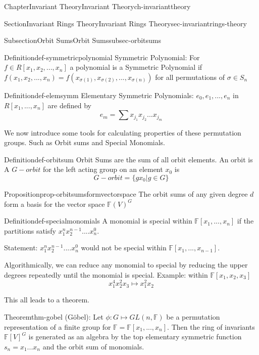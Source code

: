 \documentclass[oneside,10pt,]{book}
\begin{document}
\begin{chapterptx}{Chapter}{Invariant Theory}{}{Invariant Theory}{}{}{ch-invarianttheory}
\begin{sectionptx}{Section}{Invariant Rings Theory}{}{Invariant Rings Theory}{}{}{sec-invariantrings-theory}
\begin{subsectionptx}{Subsection}{Orbit Sums}{}{Orbit Sums}{}{}{subsec-orbitsums}
\begin{definition}{Definition}{}{def-symmetricpolynomial}%
Symmetric Polynomial: For \(f \in R[x_1,x_2,...,x_n]\) a polynomial is a Symmetric Polynomial if \(f(x_1,x_2,...,x_n) = f(x_{\sigma(1)},x_{\sigma(2)},...,x_{\sigma(n)})\) for all permutations of \(\sigma \in S_n\)%
\end{definition}
\begin{definition}{Definition}{}{def-elemsymm}%
Elementary Symmetric Polynomials: \(e_0,e_1,...,e_n\) in \(R[x_1,...,x_n]\) are defined by%
\begin{equation*}
e_{m}=\sum x_{j_1}x_{j_2}...x_{j_m} 
\end{equation*}
%
\end{definition}
We now introduce some tools for calculating properties of these permutation groups. Such as Orbit sums and Special Monomials.%
\begin{definition}{Definition}{}{def-orbitsum}%
Orbit Sums are the sum of all orbit elements. An orbit is A \(G-orbit\) for the left acting group on an element \(x_0\) is%
\begin{equation*}
G-orbit = \{gx_0 | g \in G\}
\end{equation*}
%
\end{definition}
\begin{proposition}{Proposition}{}{}{prop-orbitsumsformvectorspace}%
The orbit sums of any given degree \(d\) form a basis for the vector space \(\mathbb{F}(V)^G\)%
\end{proposition}
\begin{definition}{Definition}{}{def-specialmonomials}%
A monomial is special within \(\mathbb{F}[x_1, ... , x_n]\) if the partitions satisfy \(x_1^n x_2^{n-1}....x_n^0\).%
\end{definition}
Statement: \(x_1^n x_2^{n-1}....x_n^0\) would not be special within \(\mathbb{F}[x_1, ... , x_{n-1}]\).%
\par
Algorithmically, we can reduce any monomial to special by reducing the upper degrees repeatedly until the monomial is special. Example: within \(\mathbb{F}[x_1,x_2,x_3]\)%
\begin{equation*}
x_1^4x_2^2x_3 \mapsto x_1^2 x_2
\end{equation*}
%
\par
This all leads to a theorem.%
\begin{theorem}{Theorem}{}{}{thm-gobel}%
(Göbel): Let \(\phi:G \mapsto GL(n,\mathbb{F})\) be a permutation representation of a finite group for \(\mathbb{F} = \mathbb{F}[x_1,...,x_n]\). Then the ring of invariants \(\mathbb{F}[V]^G\) is generated as an algebra by the top elementary symmetric function \(s_n = x_1...x_n\) and the orbit sum of monomials.%

\end{theorem}
\end{subsectionptx}
\end{sectionptx}
\end{chapterptx}
\end{document}
